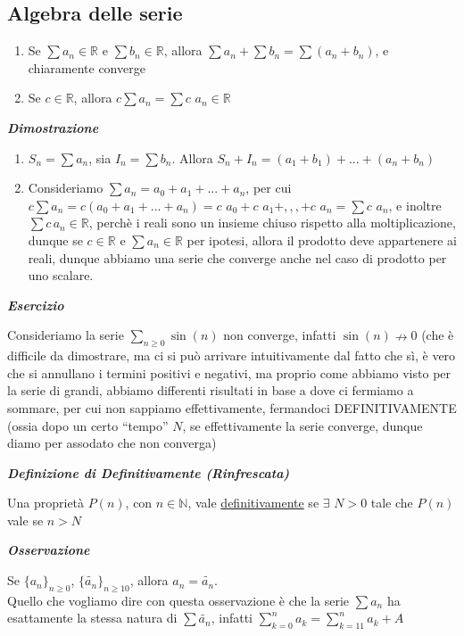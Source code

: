 \documentclass{article}
\theoremstyle{definition}
\newcommand{\R}{\mathbb{R}}
\newcommand{\N}{\mathbb{N}}
\newcommand{\virgolette}[1]{``#1''}
\begin{document}
\subsection{Algebra delle serie}
\begin{enumerate}
    \item Se $\sum a_n \in \R$ e $\sum b_n \in \R$, allora $\sum a_n + \sum b_n = \sum (a_n+b_n)$, e chiaramente converge
    \item Se $c \in \R$, allora $c\sum a_n=\sum c \,\, a_n \in \R$
\end{enumerate}
\begin{center}
    \textbf{\textit{Dimostrazione}}
\end{center}
\begin{enumerate}
    \item  $S_n=\sum a_n$, sia $I_n=\sum b_n$. Allora $S_n+I_n=(a_1+b_1)+...+(a_n+b_n)$
    \item Consideriamo $\sum a_n= a_0+a_1+...+a_n$, per cui $c \sum a_n = c (a_0+a_1+...+a_n)= c\,\,a_0+c\,\,a_1+,,,+c\,\, a_n= \sum c \,\, a_n$, e inoltre $\sum c \, a_n \in \R$, perchè i reali sono un insieme chiuso rispetto alla moltiplicazione, dunque se $c \in \R$ e $\sum a_n \in \R$ per ipotesi, allora il prodotto deve appartenere ai reali, dunque abbiamo una serie che converge anche nel caso di prodotto per uno scalare.
\end{enumerate}
\begin{center}
    \textbf{\textit{Esercizio}}
\end{center}
Consideriamo la serie $\sum_{n \geqslant 0} \sin({n})$ non converge, infatti $\sin({n}) \nrightarrow 0$ (che è difficile da dimostrare, ma ci si può arrivare intuitivamente dal fatto che sì, è vero che si annullano i termini positivi e negativi, ma proprio come abbiamo visto per la serie di grandi, abbiamo differenti risultati in base a dove ci fermiamo a sommare, per cui non sappiamo effettivamente, fermandoci DEFINITIVAMENTE (ossia dopo un certo \virgolette{tempo} $N$, se effettivamente la serie converge, dunque diamo per assodato che non converga)
\begin{center}
    \textbf{\textit{Definizione di Definitivamente (Rinfrescata)}}
\end{center}
Una proprietà $P(n)$, con $n \in \N$, vale \underline{definitivamente} se $\exists \,\, N >0$ tale che $P(n)$ vale se $n > N$
\begin{center}
    \textbf{\textit{Osservazione}}
\end{center}
Se $\{a_n\}_{n \geqslant 0}$, $\{\tilde{a_n}\}_{n \geqslant 10}$, allora $a_n = \tilde{a_n}$.
\\
Quello che vogliamo dire con questa osservazione è che la serie $\sum a_n$ ha esattamente la stessa natura di $\sum \tilde{a_n}$, infatti $\sum_{k=0}^n a_k = \sum_{k=11}^n a_k + A$
\end{document}
